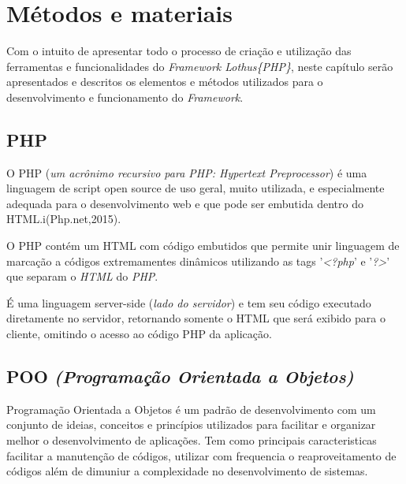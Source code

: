 \chapter{Métodos e materiais\label{cap:metodos-materiais}}
    Com o intuito de apresentar todo o processo de criação e utilização das ferramentas e funcionalidades do \emph{Framework Lothus\{PHP\}}, neste capítulo serão apresentados e descritos os elementos e métodos utilizados para o desenvolvimento e funcionamento do \emph{Framework}.

    \section{PHP\label{sec:php}}
      O PHP (\emph{um acrônimo recursivo para PHP: Hypertext Preprocessor}) é uma linguagem de script open source de uso geral, muito utilizada, e especialmente adequada para o desenvolvimento web e que pode ser embutida dentro do HTML.i(Php.net,2015).

      O PHP contém um HTML com código embutidos que permite unir linguagem de marcação a códigos extremamentes dinâmicos utilizando as tags '\emph{<?php}' e '\emph{?>}' que separam o \emph{HTML} do \emph{PHP}.

      É uma linguagem server-side (\emph{lado do servidor}) e tem seu código executado diretamente no servidor, retornando somente o HTML que será exibido para o cliente, omitindo o acesso ao código PHP da aplicação.


    \section{POO \emph{(Programação Orientada a Objetos)}\label{sec:poo}}
        Programação Orientada a Objetos é um padrão de desenvolvimento com um conjunto de ideias, conceitos e princípios utilizados para facilitar e organizar melhor o desenvolvimento de aplicações. Tem como principais caracteristicas facilitar a manutenção de códigos, utilizar com frequencia o reaproveitamento de códigos além de dimuniur a complexidade no desenvolvimento de sistemas.


